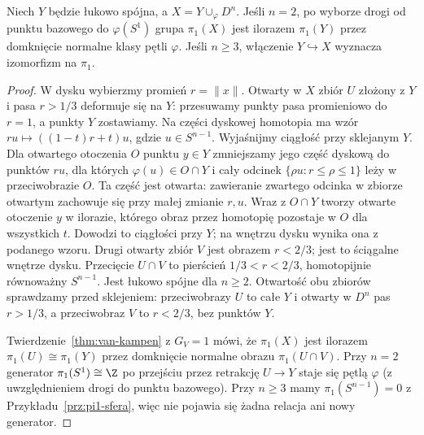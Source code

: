\begin{twierdzenie}
\label{thm:pi1-dolaczenie-komorki}
Niech $Y$ będzie łukowo spójna,
a $X=Y\cup_\varphi D^n$.
Jeśli $n=2$, po wyborze drogi od
punktu bazowego do $\varphi(S^1)$
grupa $\pi_1(X)$ jest ilorazem
$\pi_1(Y)$ przez domknięcie normalne
klasy pętli $\varphi$.
Jeśli $n\geq3$, włączenie
$Y\hookrightarrow X$ wyznacza
izomorfizm na $\pi_1$.
\end{twierdzenie}
\begin{proof}
W dysku wybierzmy promień $r=\|x\|$.
Otwarty w $X$ zbiór $U$ złożony
z $Y$ i pasa $r>1/3$ deformuje
się na $Y$: przesuwamy punkty
pasa promieniowo do $r=1$,
a punkty $Y$ zostawiamy. Na części dyskowej homotopia ma wzór
$ru\mapsto((1-t)r+t)u$, gdzie $u\in S^{n-1}$.
Wyjaśnijmy ciągłość przy sklejanym $Y$. Dla otwartego otoczenia
$O$ punktu $y\in Y$ zmniejszamy jego część dyskową do punktów $ru$,
dla których $\varphi(u)\in O\cap Y$ i cały odcinek
$\{\rho u:r\leq\rho\leq1\}$ leży w przeciwobrazie $O$.
Ta część jest otwarta: zawieranie zwartego odcinka w zbiorze
otwartym zachowuje się przy małej zmianie $r,u$.
Wraz z $O\cap Y$ tworzy otwarte otoczenie $y$ w ilorazie,
którego obraz przez homotopię pozostaje w $O$ dla wszystkich $t$.
Dowodzi to ciągłości przy $Y$; na wnętrzu dysku wynika ona z podanego wzoru.
Drugi otwarty zbiór $V$ jest
obrazem $r<2/3$; jest to
ściągalne wnętrze dysku.
Przecięcie $U\cap V$ to pierścień
$1/3<r<2/3$, homotopijnie
równoważny $S^{n-1}$.
Jest łukowo spójne dla $n\geq2$.
Otwartość obu zbiorów sprawdzamy przed sklejeniem:
przeciwobrazy $U$ to całe $Y$ i otwarty w $D^n$ pas $r>1/3$,
a przeciwobraz $V$ to $r<2/3$, bez punktów $Y$.

Twierdzenie~\ref{thm:van-kampen}
z $G_V=1$ mówi, że $\pi_1(X)$
jest ilorazem $\pi_1(U)\cong\pi_1(Y)$
przez domknięcie normalne obrazu
$\pi_1(U\cap V)$. Przy $n=2$
generator $\pi_1(S^1)\cong\Z$
po przejściu przez retrakcję
$U\to Y$ staje się pętlą
$\varphi$ (z uwzględnieniem
drogi do punktu bazowego).
Przy $n\geq3$ mamy
$\pi_1(S^{n-1})=0$ z
Przykładu~\ref{prz:pi1-sfera},
więc nie pojawia się żadna
relacja ani nowy generator.
\end{proof}

